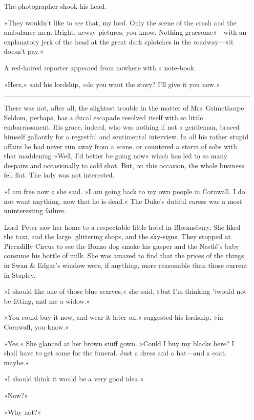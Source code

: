 The photographer shook his head.

»They wouldn't like to see that, my lord. Only the scene of the crash and the ambulance-men. Bright, newsy pictures, you know. Nothing gruesome«—with an explanatory jerk of the head at the great dark splotches in the roadway—»it doesn't pay.«

A red-haired reporter appeared from nowhere with a note-book.

»Here,« said his lordship, »do you want the story? I'll give it you now.« 

\noindent\hfil\rule{0.5\textwidth}{.4pt}\hfil 

There was not, after all, the slightest trouble in the matter of Mrs~Grimethorpe. Seldom, perhaps, has a ducal escapade resolved itself with so little embarrassment. His grace, indeed, who was nothing if not a gentleman, braced himself gallantly for a regretful and sentimental interview. In all his rather stupid affairs he had never run away from a scene, or countered a storm of sobs with that maddening »Well, I'd better be going now« which has led to so many despairs and occasionally to cold shot. But, on this occasion, the whole business fell flat. The lady was not interested.

»I am free now,« she said. »I am going back to my own people in Cornwall. I do not want anything, now that he is dead.« The Duke's dutiful caress was a most uninteresting failure.

Lord~Peter saw her home to a respectable little hotel in Bloomsbury.  She liked the taxi, and the large, glittering shops, and the sky-signs.  They stopped at Piccadilly Circus to see the Bonzo dog smoke his gasper and the Nestlé's baby consume his bottle of milk. She was amazed to find that the prices of the things in Swan \& Edgar's window were, if anything, more reasonable than those current in Stapley.

»I should like one of those blue scarves,« she said, »but I'm thinking 'twould not be fitting, and me a widow.«

»You could buy it now, and wear it later on,« suggested his lordship, »in Cornwall, you know.«

»Yes.« She glanced at her brown stuff gown. »Could I buy my blacks here? I shall have to get some for the funeral. Just a dress and a hat—and a coat, maybe.«

»I should think it would be a very good idea.«

»Now?«

»Why not?«

